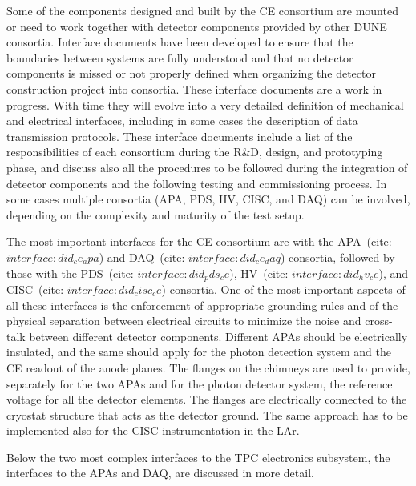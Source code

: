 
Some of the components designed and built by the CE consortium are
mounted or need to work together with detector components provided by other DUNE
consortia. Interface documents have been developed to ensure that the boundaries
between systems are fully understood and that no detector components is missed or
not properly defined when organizing the detector construction project into
consortia. These interface documents are a work in progress. With time they will
evolve into a very detailed definition of mechanical and electrical interfaces,
including in some cases the description of data transmission protocols. These
interface documents include a list of the responsibilities of each consortium during the
R\&D, design, and prototyping phase, and discuss also all the procedures to be
followed during the integration of detector components and the following testing
and commissioning process. In some cases multiple consortia (APA, PDS, HV, CISC,
and DAQ) can be involved, depending on the complexity and maturity of the test
setup.

The most important interfaces for the CE consortium are with the APA~(cite: $interface:did_ce_apa$)
and DAQ~(cite: $interface:did_ce_daq$) consortia, followed by those with the
PDS~(cite: $interface:did_pds_ce$), HV~(cite: $interface:did_hv_ce$), and
CISC~(cite: $interface:did_cisc_ce$) consortia. One of the most important aspects
of all these interfaces is the enforcement of appropriate grounding rules and
of the physical separation between electrical circuits to minimize the noise and
cross-talk between different detector components. Different APAs should be electrically
insulated, and the same should apply for the photon detection system and the
CE readout of the anode planes. The flanges on the chimneys are used to provide,
separately for the two APAs and for the photon detector system, the reference
voltage for all the detector elements. The flanges are electrically connected
to the cryostat structure that acts as the detector ground. The same approach
has to be implemented also for the CISC instrumentation in the LAr.

Below the two most complex interfaces to the TPC electronics subsystem, the
interfaces to the APAs and DAQ, are discussed in more detail.

